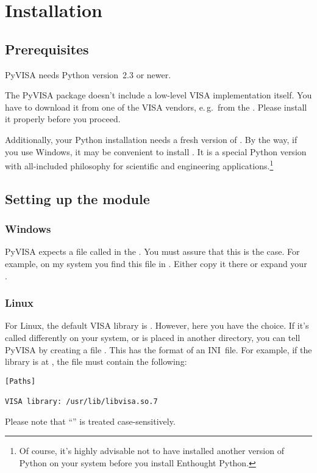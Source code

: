 \documentclass{howto}
\begin{document}
\section{Installation}

\subsection{Prerequisites}

PyVISA needs Python version~2.3 or newer.

The PyVISA package doesn't include a low-level VISA implementation itself.  You
have to download it from one of the VISA vendors, e.\,g.\ from the
.  Please install
it properly before you proceed.

Additionally, your Python installation needs a fresh version of
.  By the way,
if you use Windows, it may be convenient to install .  It is a special Python version
with all-included philosophy for scientific and engineering
applications.\footnote{Of course, it's highly advisable not to have installed
  another version of Python on your system before you install Enthought
  Python.}


\subsection{Setting up the module}

\subsubsection{Windows}

PyVISA expects a file called  in the \@.  You
must assure that this is the case.  For example, on my system you find this
file in .  Either copy it there or expand your
\@.


\subsubsection{Linux}

For Linux, the default VISA library is
.  However, here you have the
choice.  If it's called differently on your system, or is placed in another
directory, you can tell PyVISA by creating a file .  This has
the format of an INI~file.  For example, if the library is at
, the file  must contain the
following:
\begin{verbatim}
[Paths]

VISA library: /usr/lib/libvisa.so.7
\end{verbatim}
Please note that ``\code{[Paths]}'' is treated case-sensitively.
\end{document}
